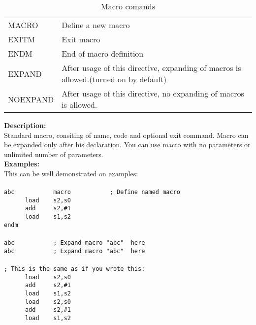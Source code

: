         \begin{table}[h!]
            \begin{tabular}{|ll|}
                    \hline
                    MACRO      & Define a new macro \\
                    EXITM      & Exit macro  \\
                    ENDM       & End of macro definition \\
                    EXPAND     & After usage of this directive, expanding of macros is allowed.(turned on by default)\\
                    NOEXPAND   & After usage of this directive, no expanding of macros is allowed.\\
                    \hline
            \end{tabular}
            \caption{Macro comands}
        \end{table}
        \textbf{Description:}\\
        Standard macro, consiting of name, code and optional exit command. Macro can be expanded only after his declaration. You can use macro
        with no parameters  or unlimited number of parameters.\\
        \textbf{Examples:}\\
        This can be well demonstrated on examples:
        {
            ~\\
            \usecodefont\\
            \verb'abc           macro           ; Define named macro '\\
            \verb'      load    s2,s0'\\
            \verb'      add     s2,#1'\\
            \verb'      load    s1,s2'\\
            \verb'endm'\\\\
            \verb'abc           ; Expand macro "abc"  here'\\
            \verb'abc           ; Expand macro "abc"  here'\\\\            
            \verb'; This is the same as if you wrote this:'\\
            \verb'      load    s2,s0'\\
            \verb'      add     s2,#1'\\
            \verb'      load    s1,s2'\\
            \verb'      load    s2,s0'\\
            \verb'      add     s2,#1'\\
            \verb'      load    s1,s2'\\
        }
           
